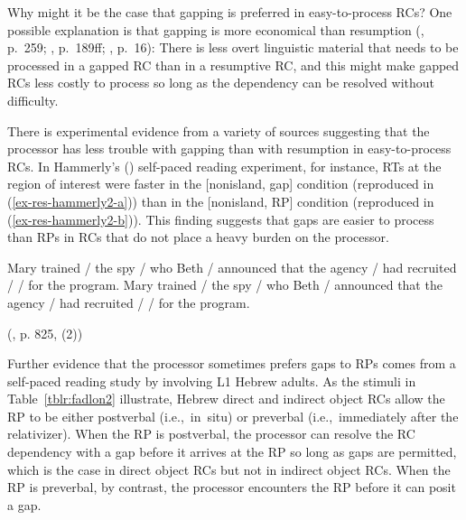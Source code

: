 Why might it be the case that gapping is preferred in easy-to-process RCs? One possible explanation is that gapping is more economical than resumption (\cite{hawkins1999}, p.~259; \cite{hawkins2004}, p.~189ff; \cite{hawkins2014}, p.~16): There is less overt linguistic material that needs to be processed in a gapped RC than in a resumptive RC, and this might make gapped RCs less costly to process so long as the dependency can be resolved without difficulty.\footnotemark{}


There is experimental evidence from a variety of sources suggesting that the processor has less trouble with gapping than with resumption in easy-to-process RCs. In Hammerly's (\citeyear{hammerly2022}) self-paced reading experiment, for instance, RTs at the region of interest were faster in the [nonisland, gap] condition (reproduced in (\ref{ex-res-hammerly2-a})) than in the [nonisland, RP] condition (reproduced in (\ref{ex-res-hammerly2-b})). This finding suggests that gaps are easier to process than RPs in RCs that do not place a heavy burden on the processor. 

\pex 
\a Mary trained / the spy / who Beth / announced that the agency / had recruited \boxing{\_\_} /  / for the program.\label{ex-res-hammerly2-a}
\a \ljudge*Mary trained / the spy / who Beth / announced that the agency / had recruited  /  / for the program.\label{ex-res-hammerly2-b}\par\nobreak\vspace{5pt}
\hfill (\cite{hammerly2022}, p. 825, (2))
\xe 

Further evidence that the processor sometimes prefers gaps to RPs comes from a self-paced reading study by \textcite{fadlon.etal2018} involving L1 Hebrew adults. As the stimuli in Table~\ref{tblr:fadlon2} illustrate, Hebrew direct and indirect object RCs allow the RP to be either postverbal (i.e.,~in~situ) or preverbal (i.e.,~immediately after the relativizer). When the RP is postverbal, the processor can resolve the RC dependency with a gap before it arrives at the RP so long as gaps are permitted, which is the case in direct object RCs but not in indirect object RCs. When the RP is preverbal, by contrast, the processor encounters the RP before it can posit a gap.

